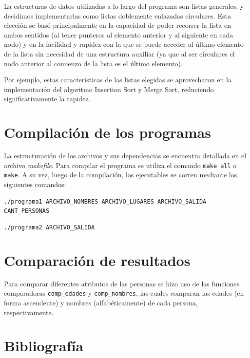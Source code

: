 \documentclass[11pt]{article}
\begin{document}
La estructuras de datos utilizadas a lo largo del programa son listas generales, y decidimos implementarlas como listas doblemente enlazadas circulares. Esta elección se basó principalmente en la capacidad de poder recorrer la lista en ambos sentidos (al tener punteros al elemento anterior y al siguiente en cada nodo) y en la facilidad y rapidez con la que se puede acceder al último elemento de la lista sin necesidad de una estructura auxiliar (ya que al ser circulares el nodo anterior al comienzo de la lista es el último elemento).\par

Por ejemplo, estas características de las listas elegidas se aprovecharon en la implementación del algoritmo Insertion Sort y Merge Sort, reduciendo significativamente la rapidez.\par

\section{Compilación de los programas}

La estructuración de los archivos y sus dependencias se encuentra detallada en el archivo \textit{makefile}. Para compilar el programa se utiliza el comando \verb|make all| o \verb|make|. A su vez, luego de la compilación, los ejecutables se corren mediante los siguientes comandos:\par

\noindent \verb|./programa1 ARCHIVO_NOMBRES ARCHIVO_LUGARES ARCHIVO_SALIDA CANT_PERSONAS| \par
\noindent \verb|./programa2 ARCHIVO_SALIDA|\par


\section{Comparación de resultados}

Para comparar diferentes atributos de las personas se hizo uso de las funciones comparadoras \verb|comp_edades| y \verb|comp_nombres|, las cuales comparan las edades (en forma ascendente) y nombres (alfabéticamente) de cada persona, respectivamente.

\section{Bibliografía}
\end{document}

